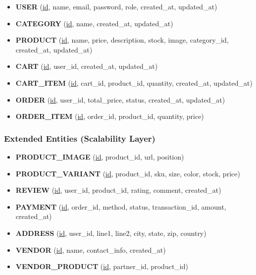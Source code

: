 \documentclass[12pt,a4paper]{article}
\begin{document}
\begin{itemize}[noitemsep]

\item \textbf{USER} (\underline{id}, name, email, password, role, created\_at, updated\_at)

\item \textbf{CATEGORY} (\underline{id}, name, created\_at, updated\_at)

\item \textbf{PRODUCT} (\underline{id}, name, price, description, stock, image, category\_id, created\_at, updated\_at)

\item \textbf{CART} (\underline{id}, user\_id, created\_at, updated\_at)

\item \textbf{CART\_ITEM} (\underline{id}, cart\_id, product\_id, quantity, created\_at, updated\_at)

\item \textbf{ORDER} (\underline{id}, user\_id, total\_price, status, created\_at, updated\_at)

\item \textbf{ORDER\_ITEM} (\underline{id}, order\_id, product\_id, quantity, price)

\end{itemize}

\subsubsection{Extended Entities (Scalability Layer)}

\begin{itemize}[noitemsep]

\item \textbf{PRODUCT\_IMAGE} (\underline{id}, product\_id, url, position)

\item \textbf{PRODUCT\_VARIANT} (\underline{id}, product\_id, sku, size, color, stock, price)

\item \textbf{REVIEW} (\underline{id}, user\_id, product\_id, rating, comment, created\_at)

\item \textbf{PAYMENT} (\underline{id}, order\_id, method, status, transaction\_id, amount, created\_at)

\item \textbf{ADDRESS} (\underline{id}, user\_id, line1, line2, city, state, zip, country)

\item \textbf{VENDOR} (\underline{id}, name, contact\_info, created\_at)

\item \textbf{VENDOR\_PRODUCT} (\underline{id}, partner\_id, product\_id)

\end{itemize}
\end{document}
